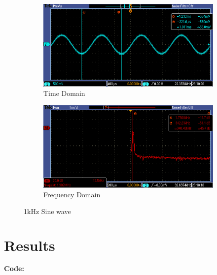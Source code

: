 \documentclass{article}
\begin{document}
\begin{figure}[H]
  \begin{center}

    \begin{subfigure}[b]{0.5\linewidth}
      \includegraphics[width=\linewidth]{img/time_dom.png}
      \caption{Time Domain}
    \end{subfigure}

    \begin{subfigure}[b]{0.5\linewidth}
      \includegraphics[width=\linewidth]{img/freq_dom.png}
      \caption{Frequency Domain}
    \end{subfigure}

  \caption{1kHz Sine wave}
  \end{center}
\end{figure}

 

\section{Results}

\textbf{Code:}
\end{document}
